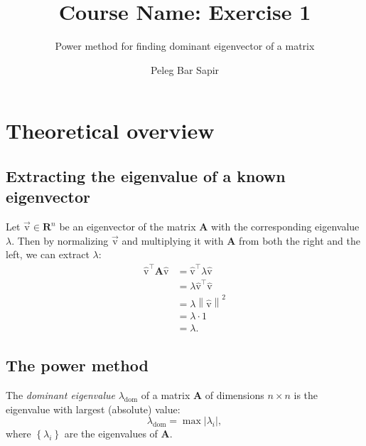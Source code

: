 \documentclass[12pt]{scrartcl}
\title{Course Name: Exercise 1}
\subtitle{Power method for finding dominant eigenvector of a matrix}
\author{Peleg Bar Sapir}
\newcommand{\mtrx}[1]{\mathbf{#1}}
\newcommand{\vvec}[1]{\vec{\mathrm{#1}}}
\newcommand{\uvec}[1]{\hat{\mathrm{#1}}}
\newcommand{\T}[1]{#1^{\intercal}}
\begin{document}
\maketitle

\section{Theoretical overview}
\subsection{Extracting the eigenvalue of a known eigenvector}
Let $\vvec{v}\in\mathbf{R}^{n}$ be an eigenvector of the matrix $\mtrx{A}$ with the corresponding eigenvalue $\lambda$. Then by normalizing $\vvec{v}$ and multiplying it with $\mtrx{A}$ from both the right and the left, we can extract $\lambda$:
\begin{equation}
    \begin{aligned}
        \T{\uvec{v}}\mtrx{A}\uvec{v} &= \T{\uvec{v}}\lambda\uvec{v}\\
                                     &= \lambda\T{\uvec{v}}\uvec{v}\\
                                     &= \lambda\left\|\uvec{v}\right\|^{2}\\
                                     &= \lambda\cdot1\\
                                     &= \lambda.
    \end{aligned}
    \label{eq:eigenval_from_vec}
\end{equation}

\subsection{The power method}
The \textit{dominant eigenvalue} $\lambda_{\mathrm{dom}}$ of a matrix $\mtrx{A}$ of dimensions $n\times n$ is the eigenvalue with largest (absolute) value:
\begin{equation}
    \lambda_{\mathrm{dom}} = \max\left|\lambda_{i}\right|,
    \label{eq:}
\end{equation}
where $\left\{\lambda_{i}\right\}$ are the eigenvalues of $\mtrx{A}$.
\end{document}
